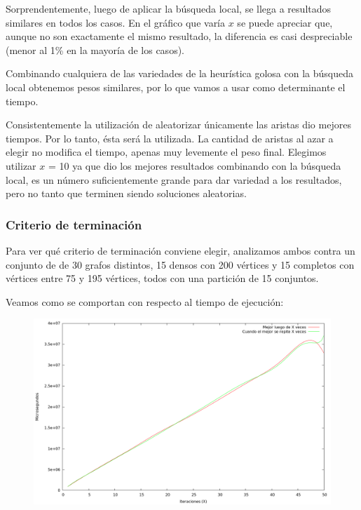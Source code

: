 \vspace*{0.5cm}

Sorprendentemente, luego de aplicar la búsqueda local, se llega a resultados
similares en todos los casos. En el gráfico que varía $x$ se puede apreciar
que, aunque no son exactamente el mismo resultado, la diferencia es casi
despreciable (menor al 1\% en la mayoría de los casos).


Combinando cualquiera de las variedades de la heurística golosa con la
búsqueda local obtenemos pesos similares, por lo que vamos a usar como
determinante el tiempo.

Consistentemente la utilización de aleatorizar únicamente las aristas dio
mejores tiempos. Por lo tanto, ésta será la utilizada. La cantidad de
aristas al azar a elegir no modifica el tiempo, apenas muy levemente el peso
final. Elegimos utilizar $x$ = 10 ya que dio los mejores resultados combinando
con la búsqueda local, es un número suficientemente grande para dar variedad a
los resultados, pero no tanto que terminen siendo soluciones aleatorias.

\subsubsection{Criterio de terminación}

Para ver qué criterio de terminación conviene elegir, analizamos ambos contra
un conjunto de de 30 grafos distintos, 15 densos con 200 vértices y 15 completos
con vértices entre 75 y 195 vértices, todos con una partición de 15 conjuntos.

Veamos como se comportan con respecto al tiempo de ejecución:

\vspace*{0.5cm}

\begin{figure}[h]
  \begin{center}
    \includegraphics[scale=0.35]{imagenes/grasp-criterio-tiempo.png}
  \end{center}
\end{figure}

